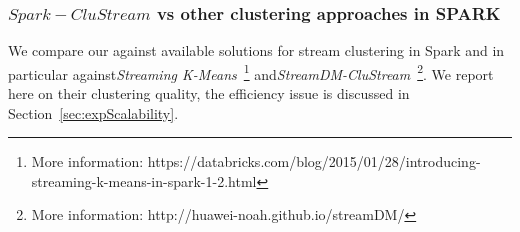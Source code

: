 \subsubsection{$Spark-CluStream$ vs other clustering approaches in SPARK}
\label{sec:expQuality-vs-SPARK}
We compare our \our against available solutions for stream clustering in Spark and in particular against\textit{Streaming K-Means}~\footnote{More information: https://databricks.com/blog/2015/01/28/introducing-streaming-k-means-in-spark-1-2.html} and\textit{StreamDM-CluStream}~\footnote{More information: http://huawei-noah.github.io/streamDM/}.
We report here on their clustering quality, the efficiency issue is discussed in Section~\ref{sec:expScalability}.




